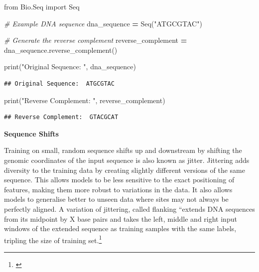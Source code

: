 \documentclass[
]{book}
\newenvironment{Shaded}{\begin{snugshade}}{\end{snugshade}}
\newcommand{\BuiltInTok}[1]{#1}
\newcommand{\CommentTok}[1]{\textcolor[rgb]{0.56,0.35,0.01}{\textit{#1}}}
\newcommand{\ImportTok}[1]{#1}
\newcommand{\NormalTok}[1]{#1}
\newcommand{\OperatorTok}[1]{\textcolor[rgb]{0.81,0.36,0.00}{\textbf{#1}}}
\newcommand{\StringTok}[1]{\textcolor[rgb]{0.31,0.60,0.02}{#1}}
\begin{document}
\begin{Shaded}
\begin{Highlighting}[]
\ImportTok{from}\NormalTok{ Bio.Seq }\ImportTok{import}\NormalTok{ Seq}

\CommentTok{\# Example DNA sequence}
\NormalTok{dna\_sequence }\OperatorTok{=}\NormalTok{ Seq(}\StringTok{"ATGCGTAC"}\NormalTok{)}

\CommentTok{\# Generate the reverse complement}
\NormalTok{reverse\_complement }\OperatorTok{=}\NormalTok{ dna\_sequence.reverse\_complement()}

\BuiltInTok{print}\NormalTok{(}\StringTok{"Original Sequence: "}\NormalTok{, dna\_sequence)}
\end{Highlighting}
\end{Shaded}

\begin{verbatim}
## Original Sequence:  ATGCGTAC
\end{verbatim}

\begin{Shaded}
\begin{Highlighting}[]
\BuiltInTok{print}\NormalTok{(}\StringTok{"Reverse Complement: "}\NormalTok{, reverse\_complement)}
\end{Highlighting}
\end{Shaded}

\begin{verbatim}
## Reverse Complement:  GTACGCAT
\end{verbatim}

\textbf{Sequence Shifts}

Training on small, random sequence shifts up and downstream by shifting the genomic coordinates of the input sequence is also known as jitter. Jittering adds diversity to the training data by creating slightly different versions of the same sequence. This allows models to be less sensitive to the exact positioning of features, making them more robust to variations in the data. It also allows models to generalise better to unseen data where sites may not always be perfectly aligned. A variation of jittering, called flanking ``extends DNA sequences from its midpoint by X base pairs and takes the left, middle and right input windows of the extended sequence as training samples with the same labels, tripling the size of training set.\footnote{\citet{cao2019}}
\end{document}
